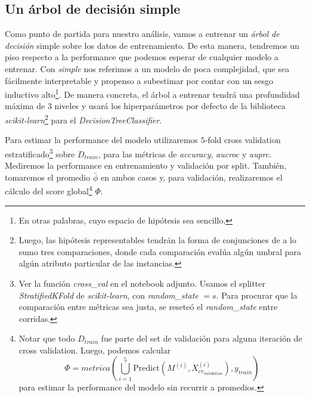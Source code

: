 \subsection{Un árbol de decisión simple}\label{simple}

Como punto de partida para nuestro análisis, vamos a entrenar un \textit{árbol de decisión} simple sobre los datos de entrenamiento. De esta manera, tendremos un piso respecto a la performance que podemos esperar de cualquier modelo a entrenar. Con \textit{simple} nos referimos a un modelo de poca complejidad, que sea fácilmente interpretable y propenso a subestimar por contar con un sesgo inductivo alto\footnote{En otras palabras, cuyo espacio de hipótesis sea sencillo.}. De manera concreta, el árbol a entrenar tendrá una profundidad máxima de $3$ niveles y usará los hiperparámetros por defecto de la biblioteca \textit{scikit-learn}\footnote{Luego, las hipótesis representables tendrán la forma de conjunciones de a lo sumo tres comparaciones, donde cada comparación evalúa algún umbral para algún atributo particular de las instancias.} para el \textit{DecisionTreeClassifier}.

Para estimar la performance del modelo utilizaremos $5$-fold cross validation estratificado\footnote{Ver la función \textit{cross\_val} en el notebook adjunto. Usamos el splitter \textit{StratifiedKFold} de \textit{scikit-learn}, con \textit{random\_state} $= s$. Para procurar que la comparación entre métricas sea justa, se reseteó el \textit{random\_state} entre corridas.} sobre $D_{train}$, para las métricas de \textit{accuracy}, \textit{aucroc} y \textit{auprc}. Mediremos la performance en entrenamiento y validación por split. También, tomaremos el promedio $\bar\phi$ en ambos casos y, para validación, realizaremos el cálculo del score global\footnote{Notar que todo $D_{train}$ fue parte del set de validación para alguna iteración de cross validation. Luego, podemos calcular $$\Phi = metrica(\bigcup_{i=1}^5\text{Predict}(M^{(i)}, X_{cv_{validation}}^{(i)}), y_{train})$$ para estimar la performance del modelo sin recurrir a promedios.} $\Phi$.

